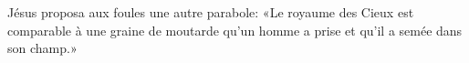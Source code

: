 \encetemps Jésus proposa aux foules une autre parabole:
	«Le royaume des Cieux est comparable à une graine de moutarde
	qu’un homme a prise et qu’il a semée dans son champ.»
